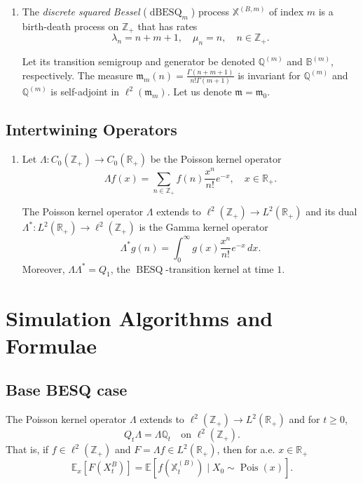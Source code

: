 \documentclass[11pt,a4,reqno]{amsart}
\numberwithin{equation}{section}
\theoremstyle{definition}
\theoremstyle{remark}
\newcommand{\bb}[1]{\mathbb{#1}}
\newcommand{\frk}[1]{\mathfrak{#1}}
\newcommand{\E}{\bb{E}}
\newcommand{\R}{\bb{R}}
\newcommand{\Z}{\bb{Z}}
\DeclareMathOperator{\besq}{BESQ}
\DeclareMathOperator{\dbesq}{dBESQ}
\DeclareMathOperator{\pois}{Pois}
\newcommand{\beq}{\begin{equation}}
\newcommand{\eeq}{\end{equation}}
\begin{document}
	\begin{enumerate}
	
		\item The \textit{discrete squared Bessel} ($\dbesq_m$) process $\bb{X}^{(B, m)}$ of index $m$ is a birth-death process on $\Z_+$ that has rates
		\beq \lambda_n = n + m + 1, \quad \mu_n = n , \quad n \in \Z_+. \eeq
		
		Let its transition semigroup and generator be denoted $\bb{Q}^{(m)}$ and $\bb{B}^{(m)}$, respectively. The measure $\frk{m}_m(n) = \frac{\Gamma(n + m + 1)}{n! \Gamma(m + 1)}$ is invariant for $\bb{Q}^{(m)}$ and $\bb{Q}^{(m)}$ is self-adjoint in $\ell^2(\frk{m}_m)$. Let us denote $\frk{m} = \frk{m}_0$. 

	
	
	\end{enumerate}

\subsection{Intertwining Operators}

	\begin{enumerate}
		
		\item Let $\Lambda : C_0(\Z_+) \to C_0(\R_+)$ be the Poisson kernel operator 
		\beq \label{eqn:poisson_kernel} \Lambda f(x) = \sum_{n \in \Z_+} f(n) \frac{x^n}{n!} e^{-x} , \quad x \in \R_+. \eeq
		
		The Poisson kernel operator $\Lambda$ extends to $\ell^2(\Z_+) \to L^2(\R_+)$ and its dual $\Lambda^* : L^2(\R_+) \to \ell^2(\Z_+)$ is the Gamma kernel operator 
		\beq \label{eqn:gamma_kernel} \Lambda^*g(n) = \int_0^\infty g(x) \frac{x^n}{n!} e^{-x} \, dx . \eeq
		Moreover, $\Lambda \Lambda^* = Q_1$, the $\besq$-transition kernel at time $1$. 
		
	\end{enumerate}


\section{Simulation Algorithms and Formulae}

\subsection{Base BESQ case} 
	The Poisson kernel operator $\Lambda$ extends to $\ell^2(\Z_+) \to L^2(\R_+)$ and for $t \geq 0$, 
	\beq Q_t\Lambda = \Lambda \bb{Q}_t \quad \text{on } \ell^2(\Z_+). \eeq
	That is, if $f \in \ell^2(\Z_+)$ and $F = \Lambda f \in L^2(\R_+)$, then for a.e. $x \in \R_+$
	\beq \E_x[F(X_t^{B})] = \E[f(\bb{X}_t^{(B)}) \mid X_0 \sim \pois(x)] . \eeq
	
\end{document}

